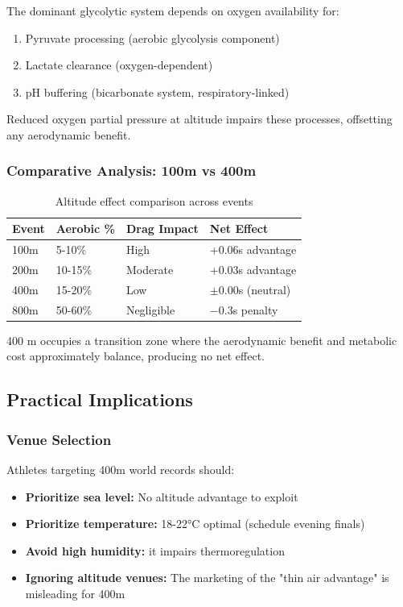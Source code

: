 The dominant glycolytic system depends on oxygen availability for:
\begin{enumerate}
    \item Pyruvate processing (aerobic glycolysis component)
    \item Lactate clearance (oxygen-dependent)
    \item pH buffering (bicarbonate system, respiratory-linked)
\end{enumerate}

Reduced oxygen partial pressure at altitude impairs these processes, offsetting any aerodynamic benefit.

\subsubsection{Comparative Analysis: 100m vs 400m}

\begin{table}[H]
\centering
\caption{Altitude effect comparison across events}
\begin{tabular}{@{}llll@{}}
\toprule
\textbf{Event} & \textbf{Aerobic \%} & \textbf{Drag Impact} & \textbf{Net Effect} \\
\midrule
100m & 5-10\% & High & +0.06s advantage \\
200m & 10-15\% & Moderate & +0.03s advantage \\
400m & 15-20\% & Low & $\pm$0.00s (neutral) \\
800m & 50-60\% & Negligible & $-0.3$s penalty \\
\bottomrule
\end{tabular}
\end{table}

400 m occupies a transition zone where the aerodynamic benefit and metabolic cost approximately balance, producing no net effect.

\subsection{Practical Implications}

\subsubsection{Venue Selection}

Athletes targeting 400m world records should:
\begin{itemize}
    \item \textbf{Prioritize sea level:} No altitude advantage to exploit
    \item \textbf{Prioritize temperature:} 18-22°C optimal (schedule evening finals)
    \item \textbf{Avoid high humidity:} it impairs thermoregulation
    \item \textbf{Ignoring altitude venues:} The marketing of the "thin air advantage" is misleading for 400m
\end{itemize}

